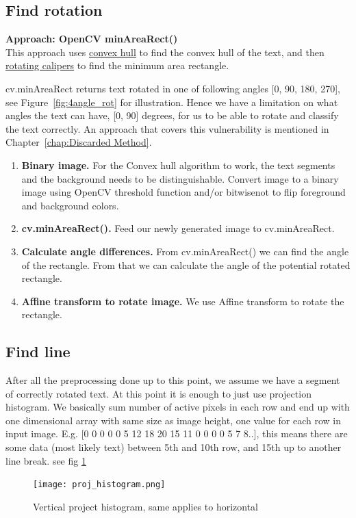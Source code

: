 \documentclass[Report.tex]{subfiles}
\begin{document}
\subsection{Find rotation}
\label{subsec:Find rotation}
\textbf{Approach: OpenCV minAreaRect()} \\
This approach uses \href{https://en.wikipedia.org/wiki/Convex_hull}{convex hull}
to find the convex hull of the text, and then
\href{https://en.wikipedia.org/wiki/Rotating_calipers}{rotating calipers} to
find the minimum area rectangle. \par
cv.minAreaRect returns text rotated in one of following angles [0\textdegree, 90\textdegree, 180\textdegree, 270\textdegree], see Figure~\ref{fig:4angle_rot} for illustration.
Hence we have a limitation on what angles the text can have, [0, 90] degrees, for us to be able to rotate and classify the text correctly. An approach that covers this vulnerability is mentioned in Chapter~\ref{chap:Discarded Method}.

\begin{flushleft}
  \begin{enumerate}
    \item \textbf{Binary image.}
    For the Convex hull algorithm to work, the text segments and the background needs to be distinguishable. Convert image to a binary image using OpenCV threshold function and/or bitwise\textunderscore not to flip foreground and background colors.
    \item \textbf{cv.minAreaRect().}
    Feed our newly generated image to cv.minAreaRect.
    \item \textbf{Calculate angle differences.}
    From cv.minAreaRect() we can find the angle of the rectangle. From that we can calculate the angle of the potential rotated rectangle.
    \item \textbf{Affine transform to rotate image.}
    We use Affine transform to rotate the rectangle.
    \end{enumerate}
\end{flushleft}


\subsection{Find line}\label{subsec:Find_line}
After all the preprocessing done up to this point, we assume we have a segment of correctly rotated text. At this point it is enough to just use projection histogram. We basically sum number of active pixels in each row and end up with one dimensional array with same size as image height, one value for each row in input image.
E.g. [0 0 0 0 0 5 12 18 20 15 11 0 0 0 0 5 7 8..], this means there are some data (most likely text) between 5th and 10th row, and 15th  up to another line break. see fig \ref{fig:Project_histogram}
\begin{figure}[H]
  \centering
  \texttt{[image: proj\_histogram.png]}
  \caption{Vertical project histogram, same applies to horizontal}
  \label{fig:Project_histogram}
\end{figure}
\end{document}
